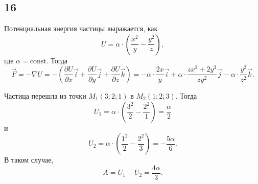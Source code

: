 \subsection{16}

Потенциальная энергия частицы выражается, как
\[
U=\alpha\cdot\left(\frac{x^2}{y}-\frac{y^2}{z}\right),
\]
где $\alpha=\text{const}$. Тогда
\[
\vec F=-\nabla U=-\left(\frac{\partial U}{\partial x}\vec i+\frac{\partial U}{\partial y}\vec j+\frac{\partial U}{\partial z}\vec k\right)=-\alpha\cdot\frac{2x}{y}\vec i+\alpha\cdot\frac{zx^2+2y^3}{zy^2}\vec j-\alpha\cdot\frac{y^2}{z^2}\vec k.
\]

Частица перешла из точки $M_1(3;2;1)$ в $M_2(1;2;3)$. Тогда
\[
U_1=\alpha\cdot\left(\frac{3^2}{2}-\frac{2^2}{1}\right)=\frac{\alpha}{2}
\]
и
\[
U_2=\alpha\cdot\left(\frac{1^2}{2}-\frac{2^2}{3}\right)=-\frac{5\alpha}{6}.
\]
В таком случае,
\[
A=U_1-U_2=\frac{4\alpha}{3}.
\]